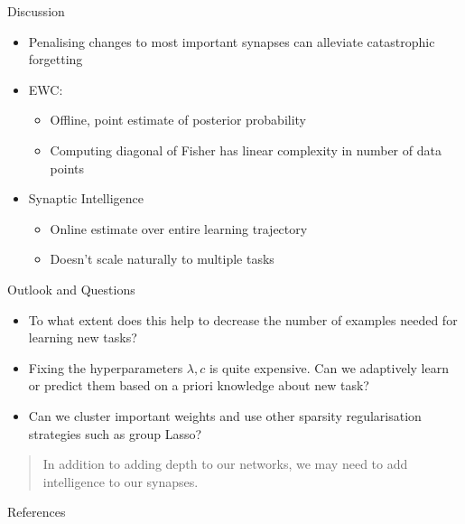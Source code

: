 \documentclass{beamer}
\begin{document}
\begin{frame}{Discussion}
	\begin{itemize}
		\item Penalising changes to most important synapses can alleviate catastrophic forgetting
		\item<2-> EWC:
		\begin{itemize}
			 \item<2-> Offline, point estimate of posterior probability
			 \item<2-> Computing diagonal of Fisher has linear complexity in number of data points
		\end{itemize}
	\item<3-> Synaptic Intelligence
	\begin{itemize}
		\item<3-> Online estimate over entire learning trajectory
		\item<3-> Doesn't scale naturally to multiple tasks
	\end{itemize}
	\end{itemize}
\end{frame}
\begin{frame}{Outlook and Questions}
\begin{itemize}
	\item<1-> To what extent does this help to decrease the number of examples needed for learning new tasks?
	\item<2-> Fixing the hyperparameters $\lambda,c$ is quite expensive. Can we adaptively learn or predict them based on a priori knowledge about new task?
	\item<3-> Can we cluster important weights and use other sparsity regularisation strategies such as group Lasso?
\end{itemize}
\end{frame}

\begin{frame}
\begin{quote}
	\textcolor{oxfordblue}{In addition to adding depth to our networks, we may need to add intelligence to our synapses.}
\end{quote}
\end{frame}


\begin{frame}{References}


\end{frame}
\end{document}
